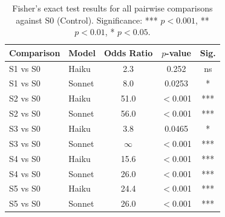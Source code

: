 \begin{table}[h]
\centering
\begin{tabular}{llccc}
\toprule
Comparison & Model & Odds Ratio & $p$-value & Sig. \\
\midrule
  S1 vs S0 & Haiku & 2.3 & 0.252 & ns \\
  S1 vs S0 & Sonnet & 8.0 & 0.0253 & * \\
  S2 vs S0 & Haiku & 51.0 & $<$0.001 & *** \\
  S2 vs S0 & Sonnet & 56.0 & $<$0.001 & *** \\
  S3 vs S0 & Haiku & 3.8 & 0.0465 & * \\
  S3 vs S0 & Sonnet & $\infty$ & $<$0.001 & *** \\
  S4 vs S0 & Haiku & 15.6 & $<$0.001 & *** \\
  S4 vs S0 & Sonnet & 26.0 & $<$0.001 & *** \\
  S5 vs S0 & Haiku & 24.4 & $<$0.001 & *** \\
  S5 vs S0 & Sonnet & 26.0 & $<$0.001 & *** \\
\bottomrule
\end{tabular}
\caption{Fisher's exact test results for all pairwise comparisons against S0 (Control). Significance: *** $p<0.001$, ** $p<0.01$, * $p<0.05$.}
\label{tab:fisher}
\end{table}